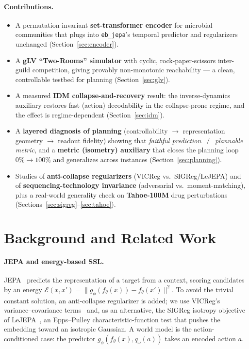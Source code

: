 \documentclass[11pt]{article}
\begin{document}
\paragraph{Contributions.}
\begin{itemize}
\item A permutation-invariant \textbf{set-transformer encoder} for microbial
communities that plugs into \texttt{eb\_jepa}'s temporal predictor and
regularizers unchanged (Section~\ref{sec:encoder}).
\item A \textbf{gLV ``Two-Rooms'' simulator} with cyclic, rock-paper-scissors
inter-guild competition, giving provably non-monotonic reachability --- a clean,
controllable testbed for planning (Section~\ref{sec:glv}).
\item A measured \textbf{IDM collapse-and-recovery} result: the inverse-dynamics
auxiliary restores fast (action) decodability in the collapse-prone regime, and
the effect is regime-dependent (Section~\ref{sec:idm}).
\item A \textbf{layered diagnosis of planning} (controllability $\to$
representation geometry $\to$ readout fidelity) showing that
\emph{faithful prediction $\neq$ plannable metric}, and a \textbf{metric
(isometry) auxiliary} that closes the planning loop $0\%\!\rightarrow\!100\%$
and generalizes across instances (Section~\ref{sec:planning}).
\item Studies of \textbf{anti-collapse regularizers} (VICReg vs.\ SIGReg/LeJEPA)
and of \textbf{sequencing-technology invariance} (adversarial vs.\
moment-matching), plus a real-world generality check on \textbf{Tahoe-100M}
drug perturbations (Sections~\ref{sec:sigreg}--\ref{sec:tahoe}).
\end{itemize}

\section{Background and Related Work}

\paragraph{JEPA and energy-based SSL.} JEPA~\cite{lecun2022path} predicts the
representation of a target from a context, scoring candidates by an energy
$\mathcal{E}(x,x')=\lVert g_\phi(f_\theta(x)) - f_\theta(x')\rVert^2$. To avoid
the trivial constant solution, an anti-collapse regularizer is added; we use
VICReg's variance--covariance terms~\cite{bardes2022vicreg} and, as an
alternative, the SIGReg isotropy objective of LeJEPA~\cite{lejepa2025}, an
Epps--Pulley characteristic-function test that pushes the embedding toward an
isotropic Gaussian. A world model is the action-conditioned case: the predictor
$g_\phi(f_\theta(x), q_\omega(a))$ takes an encoded action $a$.
\end{document}
